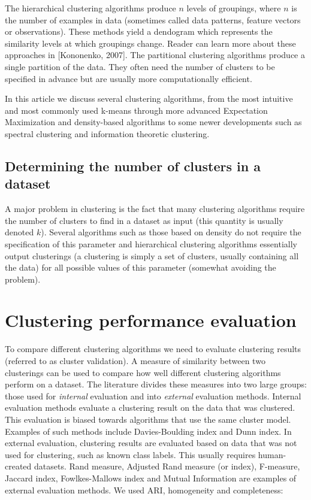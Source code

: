 \documentclass[conference]{IEEEtran}
\begin{document}
The hierarchical clustering algorithms produce $n$ levels of groupings, where $n$ is
the number of examples in data (sometimes called data patterns, feature vectors or observations). These
methods yield a dendogram which represents the similarity levels at which groupings change.
Reader can learn more about these approaches in [Kononenko, 2007]. The partitional
clustering algorithms produce a single partition of the data. They often need the number of clusters
to be specified in advance but are usually more computationally efficient.

In this article we discuss several clustering algorithms, from the most intuitive and most commonly
used k-means through more advanced Expectation Maximization and density-based algorithms
to some newer developments such as spectral clustering and information theoretic clustering.

\subsection{Determining the number of clusters in a dataset}
A major problem in clustering is the fact that many clustering algorithms require the
number of clusters to find in a dataset as input (this quantity is usually denoted $k$).
Several algorithms such as those based on density do not require the specification of this
parameter and hierarchical clustering algorithms essentially output clusterings (a clustering
is simply a set of clusters, usually containing all the data)
for all possible values of this parameter (somewhat avoiding the problem).


\section{Clustering performance evaluation}
To compare different clustering algorithms we need to evaluate clustering results (referred to as cluster validation).
A measure of similarity between two clusterings can be used to compare how well different clustering algorithms perform
on a dataset. The literature divides these measures into two large groups: those used for \textit{internal} evaluation
and into \textit{external} evaluation methods. Internal evaluation methods evaluate a clustering result on the data
that was clustered. This evaluation is biased towards algorithms that use the same cluster model. Examples of such methods
include Davies-Boulding index and Dunn index. In external evaluation, clustering results are evaluated based on data
that was not used for clustering, such as known class labels. This usually requires human-created datasets. Rand measure,
Adjusted Rand measure (or index), F-measure, Jaccard index, Fowlkes-Mallows index and Mutual Information are examples
of external evaluation methods. We used ARI, homogeneity and completeness:
\end{document}

